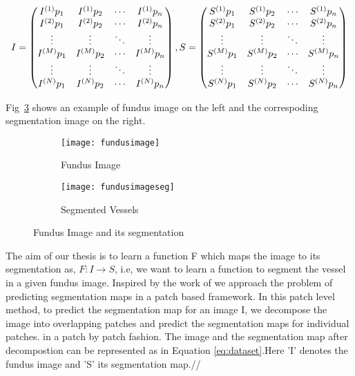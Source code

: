 \begin{equation}\label{eq:dataset}
I = 	
\begin{pmatrix}
I^{(1)}{p}_1 & I^{(1)}{p}_2 & \cdots & I^{(1)}{p}_n \\
I^{(2)}{p}_1 & I^{(2)}{p}_2 & \cdots & I^{(2)}{p}_n \\
\vdots  		  & \vdots  		  & \ddots & \vdots  \\
I^{(M)}{p}_1 & I^{(M)}{p}_2 & \cdots & I^{(M)}{p}_n \\
\vdots  		  & \vdots  		  & \ddots & \vdots  \\
I^{(N)}{p}_1 & I^{(N)}{p}_2 & \cdots & I^{(N)}{p}_n 
\end{pmatrix}
\\
,S = 	
\begin{pmatrix}
S^{(1)}{p}_1 & S^{(1)}{p}_2 & \cdots & S^{(1)}{p}_n \\
S^{(2)}{p}_1 & S^{(2)}{p}_2 & \cdots & S^{(2)}{p}_n \\
\vdots  		  & \vdots  		  & \ddots & \vdots  \\
S^{(M)}{p}_1 & S^{(M)}{p}_2 & \cdots & S^{(M)}{p}_n \\
\vdots  		  & \vdots  		  & \ddots & \vdots  \\
S^{(N)}{p}_1 & S^{(N)}{p}_2 & \cdots & S^{(N)}{p}_n 
\end{pmatrix}
\end{equation}



Fig~\ref{fig:fundus example} shows an example of fundus image on the left and the correspoding segmentation image on the right.\\

\begin{figure}
	\centering
	\begin{subfigure}[b]{0.45\textwidth}
		\centering
		\texttt{[image: fundusimage]}
		\caption{Fundus Image}
		\label{fig:fundusex}
	\end{subfigure}
	\hfill
	\begin{subfigure}[b]{0.45\textwidth}
		\centering
		\texttt{[image: fundusimageseg]}
		\caption{Segmented Vessels}
		\label{fig:fundusex seg}
	\end{subfigure}
	\caption{Fundus Image and its segmentation}
	\label{fig:fundus example}
\end{figure}

The aim of our thesis is to learn a function F which maps the image to its segmentation as, $ F: I \rightarrow S $, i.e, we want to learn a function to segment the vessel in a given fundus image. Inspired by the work of \cite{mnih2012learning,lim2013sketch} we approach the problem of predicting segmentation maps in a  patch based framework. In this patch level method, to predict the segmentation map for an image I, we decompose the image into overlapping patches and predict the segmentation maps for individual patches. in a patch by patch fashion. The image and the segmentation map after decompostion can be represented as in Equation \ref{eq:dataset}.Here 'I' denotes the fundus image and 'S' its segmentation map.//

